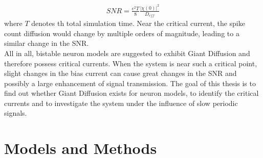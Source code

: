 \documentclass[12pt,a4paper]{article}
\begin{document}
\begin{align*}
SNR=\frac{\epsilon ^2T}{8}\frac{|\chi(0)|^2}{D_{eff}}
\end{align*}
where $T$ denotes th total simulation time. Near the critical current, the spike count diffusion would change by multiple orders of magnitude, leading to a similar change in the SNR. \\
All in all, bistable neuron models are suggested to exhibit Giant Diffusion and therefore possess critical currents. When the system is near such a critical point, slight changes in the bias current can cause great changes in the SNR and possibly a large enhancement of signal transmission. The goal of this thesis is to find out whether Giant Diffusion exists for neuron models, to identify the critical currents and to investigate the system under the influence of slow periodic signals. 

\section{Models and Methods}
\end{document}

